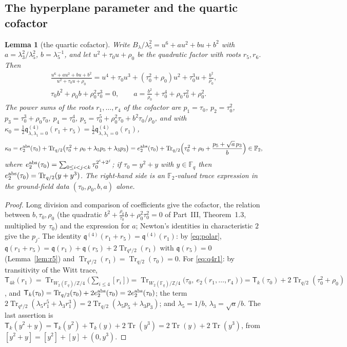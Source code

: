 \documentclass[12pt,a4paper]{amsart}
\newtheorem{lemma}[theorem]{Lemma}
\theoremstyle{definition}
\newcommand{\F}{\mathbb{F}}
\newcommand{\Z}{\mathbb{Z}}
\newcommand{\Tr}{\operatorname{Tr}}
\newcommand{\qq}{\mathfrak{q}}
\newcommand{\Tw}{\mathsf{T}}
\begin{document}
\subsection{The hyperplane parameter and the quartic cofactor}
\begin{lemma}[the quartic cofactor]\label{lem:cofactor}
Write $B_\lambda/\lambda_5^2=u^6+au^2+bu+b^2$ with $a=\lambda_3^2/\lambda_5^2$, $b=\lambda_5^{-1}$, and let $u^2+\tau_0u+\rho_0$ be the quadratic factor with roots $r_5,r_6$. Then
\begin{gather*}
\frac{u^6+au^2+bu+b^2}{u^2+\tau_0u+\rho_0}=u^4+\tau_0u^3+(\tau_0^2+\rho_0)u^2+\tau_0^3u+\frac{b^2}{\rho_0},\\
\tau_0b^2+\rho_0b+\rho_0^2\tau_0^3=0,\qquad a=\frac{b^2}{\rho_0}+\tau_0^4+\rho_0\tau_0^2+\rho_0^2 .
\end{gather*}
The power sums of the roots $r_1,\dots,r_4$ of the cofactor are $p_1=\tau_0$, $p_2=\tau_0^2$, $p_3=\tau_0^3+\rho_0\tau_0$, $p_4=\tau_0^4$, $p_5=\tau_0^5+\rho_0^2\tau_0+b^2\tau_0/\rho_0$, and with $\kappa_0=\frac12\qq^{(4)}_{\lambda,\lambda_1=0}(r_1+r_5)=\frac12\qq^{(4)}_{\lambda,\lambda_1=0}(r_1)$,
\begin{equation}\label{eq:q4r1}
\kappa_0=e_2^{\rm abs}(\tau_0)+\Tr_{q/2}\bigl(\tau_0^2+\rho_0+\lambda_5p_5+\lambda_3p_3\bigr)
=e_2^{\rm abs}(\tau_0)+\Tr_{q/2}\Bigl(\tau_0^2+\rho_0+\frac{p_5+\sqrt a\,p_3}{b}\Bigr)\in\F_2 ,
\end{equation}
where $e_2^{\rm abs}(\tau_0)=\sum_{0\le i<j<k}\tau_0^{2^i+2^j}$; if $\tau_0=y^2+y$ with $y\in\F_q$ then $e_2^{\rm abs}(\tau_0)=\Tr_{q/2}(y+y^3)$. The right-hand side is an $\F_2$-valued trace expression in the ground-field data $(\tau_0,\rho_0,b,a)$ alone.
\end{lemma}
\begin{proof}
Long division and comparison of coefficients give the cofactor, the relation between $b,\tau_0,\rho_0$ (the quadratic $b^2+\frac{\rho_0}{\tau_0}b+\rho_0^2\tau_0^2=0$ of Part~III, Theorem~1.3, multiplied by $\tau_0$) and the expression for $a$; Newton's identities in characteristic $2$ give the $p_j$. The identity $\qq^{(4)}(r_1+r_5)=\qq^{(4)}(r_1)$: by \eqref{eq:polar}, $\qq(r_1+r_5)=\qq(r_1)+\qq(r_5)+2\Tr_{q^4/2}(r_1)$ with $\qq(r_5)=0$ (Lemma~\ref{lem:r5}) and $\Tr_{q^4/2}(r_1)=\Tr_{q/2}(\tau_0)=0$. For \eqref{eq:q4r1}: by transitivity of the Witt trace, $\Tw_{4k}(r_1)=\Tr_{W_2(\F_q)/\Z/4}\bigl(\sum_{i\le4}[r_i]\bigr)=\Tr_{W_2(\F_q)/\Z/4}\bigl(\tau_0,\ e_2(r_1,\dots,r_4)\bigr)=\Tw_k(\tau_0)+2\Tr_{q/2}(\tau_0^2+\rho_0)$, and $\Tw_k(\tau_0)=\Tr_{q/2}(\tau_0)+2e_2^{\rm abs}(\tau_0)=2e_2^{\rm abs}(\tau_0)$; the term $2\Tr_{q^4/2}(\lambda_5r_1^5+\lambda_3r_1^3)=2\Tr_{q/2}(\lambda_5p_5+\lambda_3p_3)$; and $\lambda_5=1/b$, $\lambda_3=\sqrt a/b$. The last assertion is $\Tw_k(y^2+y)=\Tw_k(y^2)+\Tw_k(y)+2\Tr(y^3)=2\Tr(y)+2\Tr(y^3)$, from $[y^2+y]=[y^2]+[y]+(0,y^3)$.
\end{proof}
\end{document}
